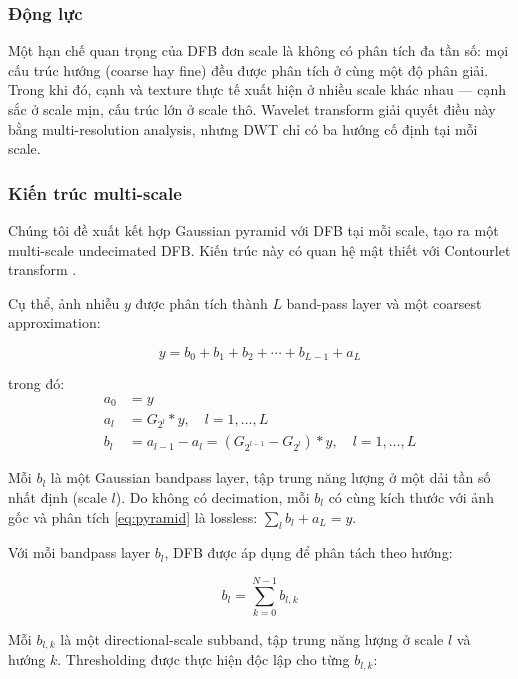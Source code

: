 \subsubsection{Động lực}

Một hạn chế quan trọng của DFB đơn scale là không có phân tích đa tần số: mọi cấu trúc hướng (coarse hay fine) đều được phân tích ở cùng một độ phân giải. Trong khi đó, cạnh và texture thực tế xuất hiện ở nhiều scale khác nhau --- cạnh sắc ở scale mịn, cấu trúc lớn ở scale thô. Wavelet transform giải quyết điều này bằng multi-resolution analysis, nhưng DWT chỉ có ba hướng cố định tại mỗi scale.

\subsubsection{Kiến trúc multi-scale}

Chúng tôi đề xuất kết hợp Gaussian pyramid với DFB tại mỗi scale, tạo ra một multi-scale undecimated DFB. Kiến trúc này có quan hệ mật thiết với Contourlet transform \cite{do2005}.

Cụ thể, ảnh nhiễu $y$ được phân tích thành $L$ band-pass layer và một coarsest approximation:

\begin{equation}
    y = b_0 + b_1 + b_2 + \cdots + b_{L-1} + a_L
    \label{eq:pyramid}
\end{equation}

trong đó:
\begin{align}
    a_0 &= y \\
    a_l &= G_{2^l} * y, \quad l = 1, \ldots, L \\
    b_l &= a_{l-1} - a_l = (G_{2^{l-1}} - G_{2^l}) * y, \quad l = 1, \ldots, L
\end{align}

Mỗi $b_l$ là một Gaussian bandpass layer, tập trung năng lượng ở một dải tần số nhất định (scale $l$). Do không có decimation, mỗi $b_l$ có cùng kích thước với ảnh gốc và phân tích \eqref{eq:pyramid} là lossless: $\sum_l b_l + a_L = y$.

Với mỗi bandpass layer $b_l$, DFB được áp dụng để phân tách theo hướng:

\begin{equation}
    b_l = \sum_{k=0}^{N-1} b_{l,k}
\end{equation}

Mỗi $b_{l,k}$ là một directional-scale subband, tập trung năng lượng ở scale $l$ và hướng $k$. Thresholding được thực hiện độc lập cho từng $b_{l,k}$:

